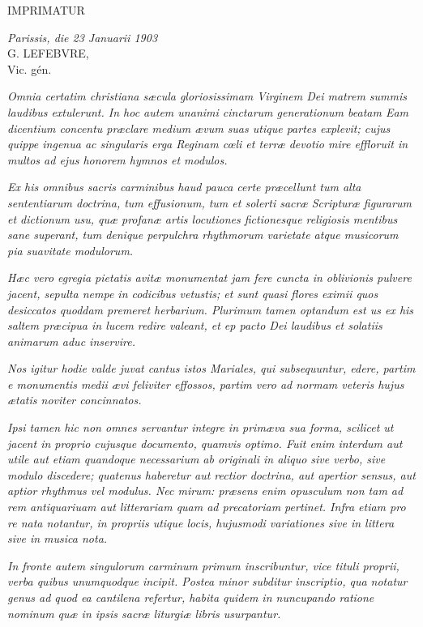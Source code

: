 IMPRIMATUR
\begin{center}
{\it Parissis, die 23 Januarii 1903}\\
\vspace{20pt}
G. LEFEBVRE,\\
Vic. gén.
\end{center}

\newpage

{\it Omnia certatim christiana sæcula gloriosissimam Virginem Dei matrem summis laudibus extulerunt. In hoc autem unanimi cinctarum generationum beatam Eam dicentium concentu præclare medium ævum suas utique partes explevit; cujus quippe ingenua ac singularis erga Reginam cœli et terræ devotio mire effloruit in multos ad ejus honorem hymnos et modulos.}

{\it Ex his omnibus sacris carminibus haud pauca certe præcellunt tum alta sententiarum doctrina, tum effusionum, tum et solerti sacræ Scripturæ figurarum et dictionum usu, quæ profanæ artis locutiones fictionesque religiosis mentibus sane superant, tum denique perpulchra rhythmorum varietate atque musicorum pia suavitate modulorum.}

{\it Hæc vero egregia pietatis avitæ monumentat jam fere cuncta in oblivionis pulvere jacent, sepulta nempe in codicibus vetustis; et sunt quasi flores eximii quos desiccatos quoddam premeret herbarium. Plurimum tamen optandum est us ex his saltem præcipua in lucem redire valeant, et ep pacto Dei laudibus et solatiis animarum aduc inservire.}

{\it Nos igitur hodie valde juvat cantus istos Mariales, qui subsequuntur, edere, partim e monumentis medii ævi feliviter effossos, partim vero ad normam veteris hujus ætatis noviter concinnatos.}

{\it Ipsi tamen hic non omnes servantur integre in primæva sua forma, scilicet ut jacent in proprio cujusque documento, quamvis optimo. Fuit enim interdum aut utile aut etiam quandoque necessarium ab originali in aliquo sive verbo, sive modulo discedere; quatenus haberetur aut rectior doctrina, aut apertior sensus, aut aptior rhythmus vel modulus. Nec mirum: præsens enim opusculum non tam ad rem antiquariuam aut litterariam quam ad precatoriam pertinet. Infra etiam pro re nata notantur, in propriis utique locis, hujusmodi variationes sive in littera sive in musica nota.}

{\it In fronte autem singulorum carminum primum inscribuntur, vice tituli proprii, verba quibus unumquodque incipit. Postea minor subditur inscriptio, qua notatur genus ad quod ea cantilena refertur, habita quidem in nuncupando ratione nominum quæ in ipsis sacræ liturgiæ libris usurpantur.}

